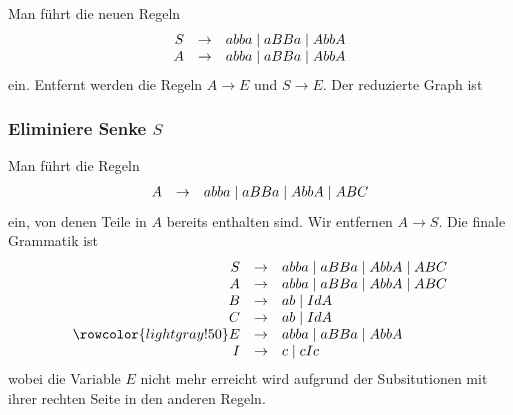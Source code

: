 \documentclass{article}
\begin{document}
Man führt die neuen Regeln
\begin{equation*}
   \begin{array}{rcl}
      S & \rightarrow & abba \mid aBBa \mid AbbA \\
      A & \rightarrow & abba \mid aBBa \mid AbbA
   \end{array}
\end{equation*}
ein. Entfernt werden die Regeln $A \rightarrow E$ und $S \rightarrow E$. Der reduzierte Graph ist

\begin{center}
\end{center}

\subsubsection{Eliminiere Senke $S$}

Man führt die Regeln
\begin{equation*}
   \begin{array}{rcl}
      A & \rightarrow & abba \mid aBBa \mid AbbA \mid ABC
   \end{array}
\end{equation*}
ein, von denen Teile in $A$ bereits enthalten sind.
Wir entfernen $A \rightarrow S$. Die finale Grammatik ist
\begin{equation*}
   \begin{array}{rcl}
      \grule{S}{abba \mid aBBa \mid AbbA \mid ABC} \\
      \grule{A}{abba \mid aBBa \mid AbbA \mid ABC} \\
      \grule{B}{ab \mid IdA} \\
      \grule{C}{ab \mid IdA} \\
      \rowcolor{lightgray!50} \grule{E}{abba \mid aBBa \mid AbbA}\\
      \grule{I}{c \mid cIc}
   \end{array}
\end{equation*}
wobei die Variable $E$ nicht mehr erreicht wird aufgrund der Subsitutionen mit
ihrer rechten Seite in den anderen Regeln.
\end{document}

